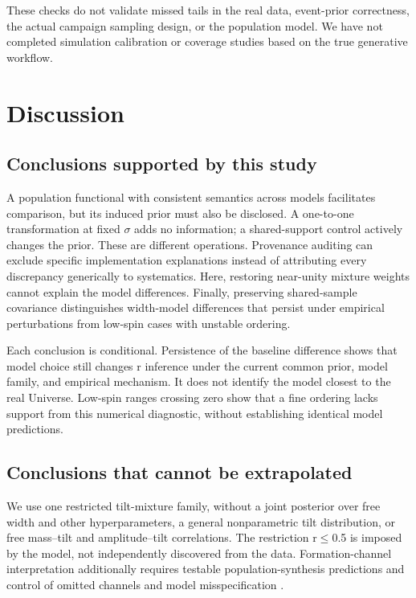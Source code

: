 \documentclass[a4paper,11pt]{article}
\begin{document}
These checks do not validate missed tails in the real data, event-prior correctness, the actual campaign sampling design, or the population model. We have not completed simulation calibration or coverage studies based on the true generative workflow.

\FloatBarrier
\section{Discussion}\label{sec:9}
\subsection{Conclusions supported by this study}\label{sec:9.1}
A population functional with consistent semantics across models facilitates comparison, but its induced prior must also be disclosed. A one-to-one transformation at fixed \(\sigma\) adds no information; a shared-support control actively changes the prior. These are different operations. Provenance auditing can exclude specific implementation explanations instead of attributing every discrepancy generically to systematics. Here, restoring near-unity mixture weights cannot explain the model differences. Finally, preserving shared-sample covariance distinguishes width-model differences that persist under empirical perturbations from low-spin cases with unstable ordering.

Each conclusion is conditional. Persistence of the baseline difference shows that model choice still changes r inference under the current common prior, model family, and empirical mechanism. It does not identify the model closest to the real Universe. Low-spin ranges crossing zero show that a fine ordering lacks support from this numerical diagnostic, without establishing identical model predictions.

\subsection{Conclusions that cannot be extrapolated}\label{sec:9.2}
We use one restricted tilt-mixture family, without a joint posterior over free width and other hyperparameters, a general nonparametric tilt distribution, or free mass–tilt and amplitude–tilt correlations. The restriction r\(\leq\)0.5 is imposed by the model, not independently discovered from the data. Formation-channel interpretation additionally requires testable population-synthesis predictions and control of omitted channels and model misspecification \cite{ref1}.
\end{document}
